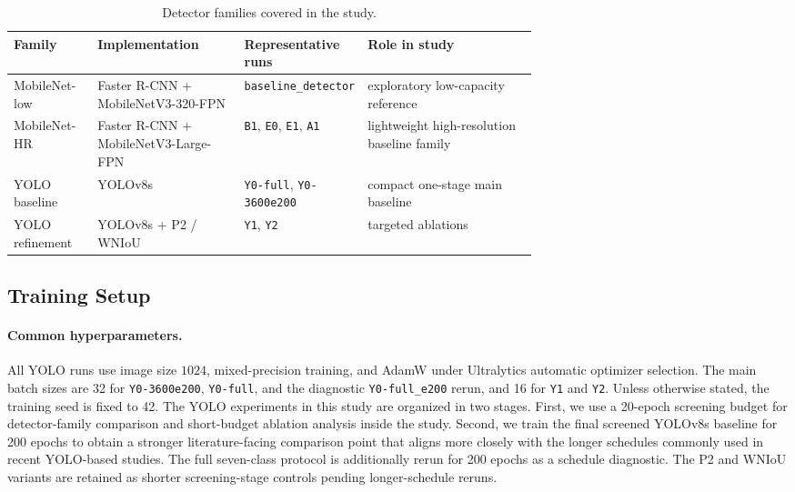 \begin{table}[t]
  \centering
  \caption{Detector families covered in the study.}
  \label{tab:detector-families}
  \footnotesize
  \setlength{\tabcolsep}{4pt}
  \begin{tabularx}{\linewidth}{>{\raggedright\arraybackslash}p{0.16\linewidth} >{\raggedright\arraybackslash}p{0.28\linewidth} >{\raggedright\arraybackslash}p{0.23\linewidth} X}
    \toprule
    Family & Implementation & Representative runs & Role in study \\
    \midrule
    MobileNet-low & Faster R-CNN + MobileNetV3-320-FPN & \texttt{baseline\_detector} & exploratory low-capacity reference \\
    MobileNet-HR & Faster R-CNN + MobileNetV3-Large-FPN & \texttt{B1}, \texttt{E0}, \texttt{E1}, \texttt{A1} & lightweight high-resolution baseline family \\
    YOLO baseline & YOLOv8s & \texttt{Y0-full}, \texttt{Y0-3600e200} & compact one-stage main baseline \\
    YOLO refinement & YOLOv8s + P2 / WNIoU & \texttt{Y1}, \texttt{Y2} & targeted ablations \\
    \bottomrule
  \end{tabularx}
\end{table}

\subsection{Training Setup}
\label{sec:training}

\paragraph{Common hyperparameters.}
All YOLO runs use image size $1024$, mixed-precision training, and AdamW under Ultralytics automatic optimizer selection. The main batch sizes are 32 for \texttt{Y0-3600e200}, \texttt{Y0-full}, and the diagnostic \texttt{Y0-full\_e200} rerun, and 16 for \texttt{Y1} and \texttt{Y2}. Unless otherwise stated, the training seed is fixed to 42. The YOLO experiments in this study are organized in two stages. First, we use a 20-epoch screening budget for detector-family comparison and short-budget ablation analysis inside the study. Second, we train the final screened YOLOv8s baseline for 200 epochs to obtain a stronger literature-facing comparison point that aligns more closely with the longer schedules commonly used in recent YOLO-based studies. The full seven-class protocol is additionally rerun for 200 epochs as a schedule diagnostic. The P2 and WNIoU variants are retained as shorter screening-stage controls pending longer-schedule reruns.

